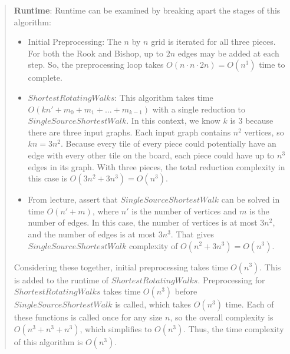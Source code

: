 \documentclass[11pt]{article}
\begin{document}
\begin{enumerate}
\begin{enumerate}
\begin{quote}
            \textbf{Runtime}: \newline 
            Runtime can be examined by breaking apart the stages of this algorithm: 
            \begin{itemize}
                \item Initial Preprocessing: The $n$ by $n$ grid is iterated for all three pieces. For both the Rook and Bishop, up to $2n$ edges may be added at each step. So, the preprocessing loop takes $O(n \cdot n \cdot 2n) = O(n^3)$ time to complete.
                \item $ShortestRotatingWalks$: This algorithm takes time $O(kn' + m_0 + m_1 + \dots + m_{k - 1})$ with a single reduction to $SingleSourceShortestWalk$. In this context, we know $k$ is $3$ because there are three input graphs. Each input graph contains $n^2$ vertices, so $kn = 3n^2$. Because every tile of every piece could potentially have an edge with every other tile on the board, each piece could have up to $n^3$ edges in its graph. With three pieces, the total reduction complexity in this case is $O(3n^2 + 3n^3) = O(n^3)$.
                \item From lecture, assert that $SingleSourceShortestWalk$ can be solved in time $O(n' + m)$, where $n'$ is the number of vertices and $m$ is the number of edges. In this case, the number of vertices is at most $3n^2$, and the number of edges is at most $3n^3$. That gives $SingleSourceShortestWalk$ complexity of $O(n^2 + 3n^3) = O(n^3)$.
            \end{itemize}
            \vspace{1em}
            Considering these together, initial preprocessing takes time $O(n^3)$. This is added to the runtime of $ShortestRotatingWalks$. Preprocessing for $ShortestRotatingWalks$ takes time $O(n^3)$ before $SingleSourceShortestWalk$ is called, which takes $O(n^3)$ time. Each of these functions is called once for any size $n$, so the overall complexity is $O(n^3 + n^3 + n^3)$, which simplifies to $O(n^3)$. Thus, the time complexity of this algorithm is $O(n^3)$.
            
        \end{quote}

 \end{enumerate}
 
\end{enumerate}
\end{document}
